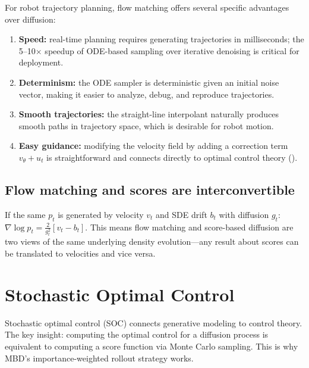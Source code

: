 \documentclass[11pt,letterpaper]{article}
\theoremstyle{plain}
\theoremstyle{definition}
\theoremstyle{remark}
\newcommand{\grad}{\nabla}
\begin{document}
For robot trajectory planning, flow matching offers several specific
advantages over diffusion:
\begin{enumerate}[nosep]
  \item \textbf{Speed:} real-time planning requires generating
    trajectories in milliseconds; the 5--10$\times$ speedup of ODE-based
    sampling over iterative denoising is critical for deployment.
  \item \textbf{Determinism:} the ODE sampler is deterministic given an
    initial noise vector, making it easier to analyze, debug, and
    reproduce trajectories.
  \item \textbf{Smooth trajectories:} the straight-line interpolant
    naturally produces smooth paths in trajectory space, which is
    desirable for robot motion.
  \item \textbf{Easy guidance:} modifying the velocity field by adding a
    correction term $v_\theta+u_t$ is straightforward and connects
    directly to optimal control theory ().
\end{enumerate}

\begin{advancedmath}
\subsection{Flow matching and scores are interconvertible}

If the same $p_t$ is generated by velocity $v_t$ and SDE drift $b_t$
with diffusion $g_t$:
$\grad\log p_t=\frac{2}{g_t^2}[v_t-b_t]$.
This means flow matching and score-based diffusion are two views of the
same underlying density evolution---any result about scores can be
translated to velocities and vice versa.
\end{advancedmath}
\section{Stochastic Optimal Control}\label{sec:soc}

Stochastic optimal control (SOC) connects generative modeling to
control theory. The key insight: computing the optimal control for a
diffusion process is equivalent to computing a score function via
Monte Carlo sampling.  This is why MBD's importance-weighted rollout
strategy works.
\end{document}
